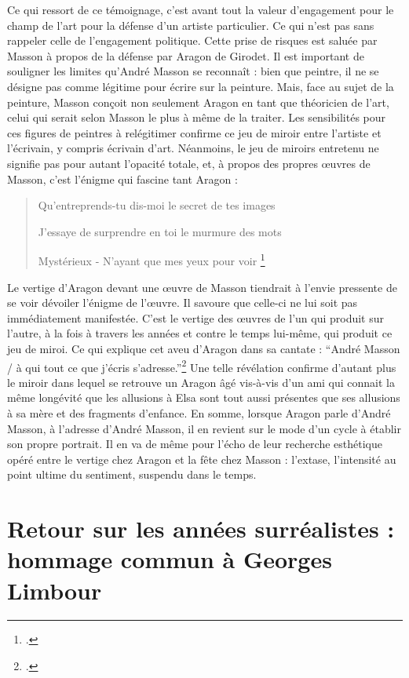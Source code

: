 	Ce qui ressort de ce témoignage, c’est avant tout la valeur d’engagement pour le champ de l’art pour la défense d’un artiste particulier. Ce qui n’est pas sans rappeler celle de l’engagement politique. Cette prise de risques est saluée par Masson à propos de la défense par Aragon de Girodet. Il est important de souligner les limites qu’André Masson se reconnaît : bien que peintre, il ne se désigne pas comme légitime pour écrire sur la peinture. Mais, face au sujet de la peinture, Masson conçoit non seulement Aragon en tant que théoricien de l’art, celui qui serait selon Masson le plus à même de la traiter. Les sensibilités pour ces figures de peintres à relégitimer confirme ce jeu de miroir entre l’artiste et l’écrivain, y compris écrivain d’art. Néanmoins, le jeu de miroirs entretenu ne signifie pas pour autant l’opacité totale, et, à propos des propres \oe{}uvres de Masson, c’est l’énigme qui fascine tant Aragon :

\begin{verse}
Qu’entreprends-tu dis-moi le secret de tes images

J’essaye de surprendre en toi le murmure des mots

Mystérieux - N’ayant que mes yeux pour voir	
\footcite[p685]{ecritssurla}\end{verse}

	Le vertige d’Aragon devant une \oe{}uvre de Masson tiendrait à l’envie pressente de se voir dévoiler l’énigme de l’\oe{}uvre. Il savoure que celle-ci ne lui soit pas immédiatement manifestée. C’est le vertige des \oe{}uvres de l’un qui produit sur l’autre, à la fois à travers les années et contre le temps lui-même, qui produit ce jeu de miroi. Ce qui explique cet aveu d’Aragon dans sa cantate : \enquote{André Masson / à qui tout ce que j’écris s’adresse.}\footcite[p692]{ecritssurla} Une telle révélation confirme d’autant plus le miroir dans lequel se retrouve un Aragon âgé vis-à-vis d’un ami qui connait la même longévité que les allusions à Elsa sont tout aussi présentes que ses allusions à sa mère et des fragments d’enfance. En somme, lorsque Aragon parle d’André Masson, à l’adresse d’André Masson, il en revient sur le mode d’un cycle à établir son propre portrait. Il en va de même pour l’écho de leur recherche esthétique opéré entre le vertige chez Aragon et la fête chez Masson : l’extase, l’intensité au point ultime du sentiment, suspendu dans le temps. 


\section{Retour sur les années surréalistes : hommage commun à Georges Limbour} 

